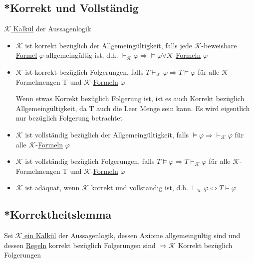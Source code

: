 \documentclass[12pt,a4paper]{article} %
\begin{document}
	\subsection{*Korrekt und Vollständig}
	\label{ALVollstandig}
	\hyperref[Kalkul]{$\mathcal{K}$ Kalkül} der Aussagenlogik
	\begin{itemize}
		\item $\mathcal{K}$ ist korrekt bezüglich der Allgemeingültigkeit, falls jede $\mathcal{K}$-beweisbare \hyperref[Formel]{Formel} $\varphi$ allgemeingültig ist, d.h. $\hyperref[Beweisbar]{\vdash_{\mathcal{K}}} \varphi \Rightarrow \hyperref[Erfullbar]{\vDash} \varphi \forall \mathcal{K}$-\hyperref[Formel]{Formeln} $\varphi$ 
		\item $\mathcal{K}$ ist korrekt bezüglich Folgerungen, falls $T \hyperref[Beweisbar]{\vdash_{\mathcal{K}}} \varphi \Rightarrow T \hyperref[Erfullbar]{\vDash} \varphi$ für alle $\mathcal{K}$-Formelmengen T und $\mathcal{K}$-\hyperref[Formel]{Formeln} $\varphi$
		
		Wenn etwas Korrekt bezüglich Folgerung ist, ist es auch Korrekt bezüglich Allgemeingültigkeit, da T auch die Leer Menge sein kann. Es wird eigentlich nur bezüglich Folgerung betrachtet
		\item $\mathcal{K}$ ist vollständig bezüglich der Allgemeingültigkeit, falls $\hyperref[Erfullbar]{\vDash} \varphi \Rightarrow \hyperref[Beweisbar]{\vdash_{\mathcal{K}}} \varphi$ für alle $\mathcal{K}$-\hyperref[Formel]{Formeln} $\varphi$
		\item $\mathcal{K}$ ist vollständig bezüglich Folgerungen, falls $T \hyperref[Erfullbar]{\vDash} \varphi \Rightarrow T \hyperref[Beweisbar]{\vdash_{\mathcal{K}}} \varphi$ für alle $\mathcal{K}$-Formelmengen T und $\mathcal{K}$-\hyperref[Formel]{Formeln} $\varphi$
		\item $\mathcal{K}$ ist adäquat, wenn $\mathcal{K}$ korrekt und vollständig ist, d.h. $\hyperref[Beweisbar]{\vdash_{\mathcal{K}}} \varphi \Leftrightarrow T \hyperref[Erfullbar]{\vDash} \varphi$
	\end{itemize}

	\subsection{*Korrektheitslemma}
	Sei \hyperref[Kalkul]{$\mathcal{K}$ ein Kalkül} der Aussagenlogik, dessen Axiome allgemeingültig sind und dessen \hyperref[Kalkul]{Regeln} korrekt bezüglich Folgerungen sind $\Rightarrow \mathcal{K}$ Korrekt bezüglich Folgerungen
	
\end{document}

